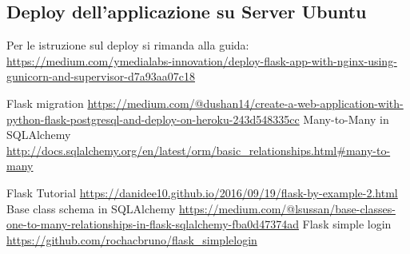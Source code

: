\documentclass{article}
\begin{document}
\subsection{Deploy dell'applicazione su Server Ubuntu}
Per le istruzione sul deploy si rimanda alla guida:
\url{https://medium.com/ymedialabs-innovation/deploy-flask-app-with-nginx-using-gunicorn-and-supervisor-d7a93aa07c18}



\newpage
\begin{thebibliography}{Bibliografia}
  Flask migration \url{https://medium.com/@dushan14/create-a-web-application-with-python-flask-postgresql-and-deploy-on-heroku-243d548335cc}
  Many-to-Many in SQLAlchemy  \url{http://docs.sqlalchemy.org/en/latest/orm/basic_relationships.html#many-to-many}

  Flask Tutorial \url{https://danidee10.github.io/2016/09/19/flask-by-example-2.html}
  Base class schema in SQLAlchemy \url{https://medium.com/@lsussan/base-classes-one-to-many-relationships-in-flask-sqlalchemy-fba0d47374ad}
 Flask simple login \url{https://github.com/rochacbruno/flask_simplelogin}
\end{thebibliography}
\end{document}

